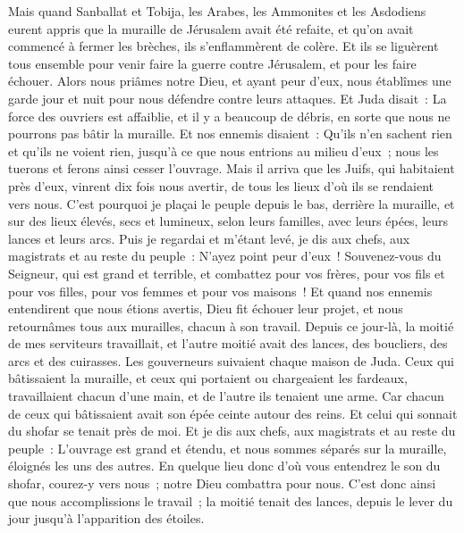 \begin{multicols}{2}
Mais quand Sanballat et Tobija, les Arabes, les Ammonites et les Asdodiens eurent appris que la muraille de Jérusalem avait été refaite, et qu'on avait commencé à fermer les brèches, ils s'enflammèrent de colère.
Et ils se liguèrent tous ensemble pour venir faire la guerre contre Jérusalem, et pour les faire échouer.
Alors nous priâmes notre Dieu, et ayant peur d'eux, nous établîmes une garde jour et nuit pour nous défendre contre leurs attaques.
Et Juda disait~: La force des ouvriers est affaiblie, et il y a beaucoup de débris, en sorte que nous ne pourrons pas bâtir la muraille.
Et nos ennemis disaient~: Qu'ils n'en sachent rien et qu'ils ne voient rien, jusqu'à ce que nous entrions au milieu d'eux~; nous les tuerons et ferons ainsi cesser l'ouvrage.
Mais il arriva que les Juifs, qui habitaient près d'eux, vinrent dix fois nous avertir, de tous les lieux d'où ils se rendaient vers nous.
C'est pourquoi je plaçai le peuple depuis le bas, derrière la muraille, et sur des lieux élevés, secs et lumineux, selon leurs familles, avec leurs épées, leurs lances et leurs arcs.
Puis je regardai et m'étant levé, je dis aux chefs, aux magistrats et au reste du peuple~: N'ayez point peur d'eux~! Souvenez-vous du Seigneur, qui est grand et terrible, et combattez pour vos frères, pour vos fils et pour vos filles, pour vos femmes et pour vos maisons~!
Et quand nos ennemis entendirent que nous étions avertis, Dieu fit échouer leur projet, et nous retournâmes tous aux murailles, chacun à son travail.
Depuis ce jour-là, la moitié de mes serviteurs travaillait, et l'autre moitié avait des lances, des boucliers, des arcs et des cuirasses. Les gouverneurs suivaient chaque maison de Juda.
Ceux qui bâtissaient la muraille, et ceux qui portaient ou chargeaient les fardeaux, travaillaient chacun d'une main, et de l'autre ils tenaient une arme.
Car chacun de ceux qui bâtissaient avait son épée ceinte autour des reins. Et celui qui sonnait du shofar se tenait près de moi.
Et je dis aux chefs, aux magistrats et au reste du peuple~: L'ouvrage est grand et étendu, et nous sommes séparés sur la muraille, éloignés les uns des autres.
En quelque lieu donc d'où vous entendrez le son du shofar, courez-y vers nous~; notre Dieu combattra pour nous.
C'est donc ainsi que nous accomplissions le travail~; la moitié tenait des lances, depuis le lever du jour jusqu'à l'apparition des étoiles.

\end{multicols}
